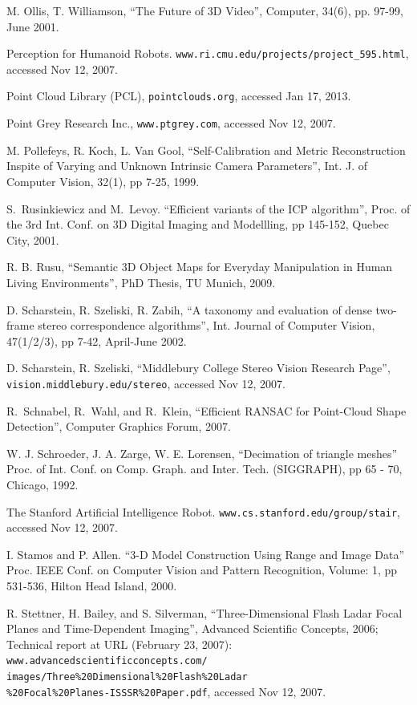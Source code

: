 \documentclass[twocolumn,oneside]{book}
\begin{document}
\begin{thebibliography}{99}
M. Ollis, T. Williamson,
``The Future of 3D Video'', Computer, 34(6), pp. 97-99, June 2001.

Perception for Humanoid Robots.
\verb+www.ri.cmu.edu/projects/project_595.html+, accessed Nov 12, 2007.

Point Cloud Library (PCL),
\verb+pointclouds.org+, accessed Jan 17, 2013.

Point Grey Research Inc.,
\verb+www.ptgrey.com+, accessed Nov 12, 2007.

M. Pollefeys, R. Koch, L. Van Gool,
``Self-Calibration and Metric Reconstruction Inspite of Varying and Unknown Intrinsic Camera Parameters'',
Int. J. of Computer Vision, 32(1), pp 7-25, 1999.

S.~Rusinkiewicz and M.~Levoy.
``Efficient variants of the {ICP} algorithm'',
Proc. of the 3rd Int. Conf. on 3D Digital Imaging and Modellling, pp 145-152,
Quebec City, 2001.

R. B. Rusu,
``Semantic 3D Object Maps for Everyday Manipulation in Human Living Environments'',
PhD Thesis, TU Munich, 2009.

D. Scharstein, R. Szeliski, R. Zabih,
``A taxonomy and evaluation of dense two-frame stereo correspondence algorithms'',
Int. Journal of Computer Vision, 47(1/2/3), pp 7-42, April-June 2002.

D. Scharstein, R. Szeliski,
``Middlebury College Stereo Vision Research Page'',
\verb+vision.middlebury.edu/stereo+, accessed Nov 12, 2007.

R.~Schnabel, R.~Wahl, and R.~Klein,
``Efficient RANSAC for Point-Cloud Shape Detection'',
Computer Graphics Forum, 2007.

W. J. Schroeder, J. A. Zarge, W. E. Lorensen,
``Decimation of triangle meshes''
Proc.  of Int. Conf. on Comp. Graph. and Inter. Tech. (SIGGRAPH), pp 65 - 70, Chicago, 1992.

The Stanford Artificial Intelligence Robot.
\verb+www.cs.stanford.edu/group/stair+, accessed Nov 12, 2007.

I. Stamos and P. Allen.
``3-D Model Construction Using Range and Image Data''
Proc. IEEE Conf. on Computer Vision and Pattern Recognition, 
Volume: 1,  pp 531-536, Hilton Head Island, 2000. 

R. Stettner, H. Bailey, and S. Silverman,
``Three-Dimensional Flash Ladar Focal Planes and Time-Dependent Imaging'',
Advanced Scientific Concepts, 2006;
Technical report at URL (February 23, 2007):
\verb+www.advancedscientificconcepts.com/+\\
\verb+images/Three%20Dimensional%20Flash%20Ladar+\\
\verb+%20Focal%20Planes-ISSSR%20Paper.pdf+, accessed Nov 12, 2007.


\end{thebibliography}
\end{document}
